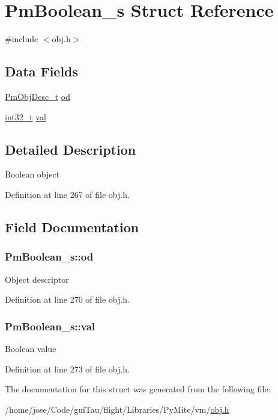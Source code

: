 \hypertarget{struct_pm_boolean__s}{\section{Pm\-Boolean\-\_\-s Struct Reference}
\label{struct_pm_boolean__s}
}


{\ttfamily \#include $<$obj.\-h$>$}

\subsection*{Data Fields}
\begin{DoxyCompactItemize}
\item 
\hyperlink{obj_8h_a72d816790acd8eb550fb25268c2b3489}{Pm\-Obj\-Desc\-\_\-t} \hyperlink{struct_pm_boolean__s_a00ec789a4dc7cc8f11e56775e684d66b}{od}
\item 
\hyperlink{group___n_a_m_e_gafd12020da5a235dfcf0c3c748fb5baed}{int32\-\_\-t} \hyperlink{struct_pm_boolean__s_aa6f78fdde9343fca0ab5d2ef6b1b0e1d}{val}
\end{DoxyCompactItemize}


\subsection{Detailed Description}
Boolean object 

Definition at line 267 of file obj.\-h.



\subsection{Field Documentation}
\hypertarget{struct_pm_boolean__s_a00ec789a4dc7cc8f11e56775e684d66b}{
\subsubsection[{od}]{ Pm\-Boolean\-\_\-s\-::od}}\label{struct_pm_boolean__s_a00ec789a4dc7cc8f11e56775e684d66b}
Object descriptor 

Definition at line 270 of file obj.\-h.

\hypertarget{struct_pm_boolean__s_aa6f78fdde9343fca0ab5d2ef6b1b0e1d}{
\subsubsection[{val}]{ Pm\-Boolean\-\_\-s\-::val}}\label{struct_pm_boolean__s_aa6f78fdde9343fca0ab5d2ef6b1b0e1d}
Boolean value 

Definition at line 273 of file obj.\-h.



The documentation for this struct was generated from the following file\-:\begin{DoxyCompactItemize}
\item 
/home/jose/\-Code/gui\-Tau/flight/\-Libraries/\-Py\-Mite/vm/\hyperlink{obj_8h}{obj.\-h}\end{DoxyCompactItemize}
